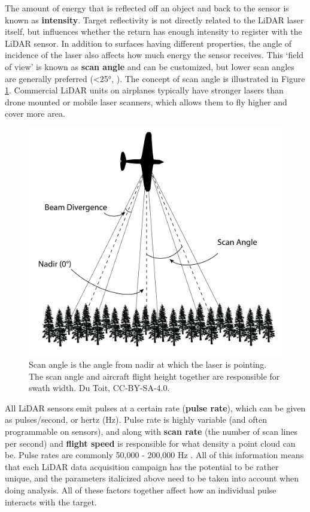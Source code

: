 \documentclass[
]{book}
\begin{document}
The amount of energy that is reflected off an object and back to the sensor is known as \textbf{intensity}. Target reflectivity is not directly related to the LiDAR laser itself, but influences whether the return has enough intensity to register with the LiDAR sensor. In addition to surfaces having different properties, the angle of incidence of the laser also affects how much energy the sensor receives. This `field of view' is known as \textbf{scan angle} and can be customized, but lower scan angles are generally preferred (\textless25°, \citet{white_best_2013}). The concept of scan angle is illustrated in Figure \ref{fig:15-Scan-Angle}. Commercial LiDAR units on airplanes typically have stronger lasers than drone mounted or mobile laser scanners, which allows them to fly higher and cover more area.

\begin{figure}
\includegraphics[width=0.6\linewidth]{images/15-Scan-Angle} \caption{Scan angle is the angle from nadir at which the laser is pointing. The scan angle and aircraft flight height together are responsible for swath width. Du Toit, CC-BY-SA-4.0.}\label{fig:15-Scan-Angle}
\end{figure}

All LiDAR sensors emit pulses at a certain rate (\textbf{pulse rate}), which can be given as pulses/second, or hertz (Hz). Pulse rate is highly variable (and often programmable on sensors), and along with \textbf{scan rate} (the number of scan lines per second) and \textbf{flight speed} is responsible for what density a point cloud can be. Pulse rates are commonly 50,000 - 200,000 Hz \citep{white_best_2013}. All of this information means that each LiDAR data acquisition campaign has the potential to be rather unique, and the parameters italicized above need to be taken into account when doing analysis. All of these factors together affect how an individual pulse interacts with the target.
\end{document}
